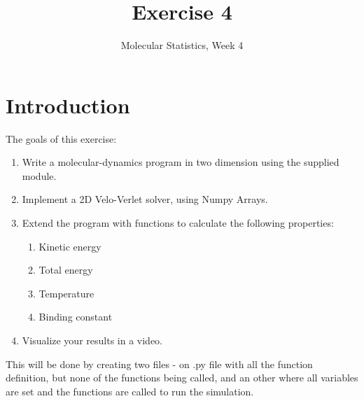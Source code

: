 \documentclass{article}
\title{Exercise 4}
\author{Molecular Statistics, Week 4}
\date{}
\begin{document}

\maketitle

\section{Introduction}









The goals of this exercise:
\begin{enumerate}
    \item Write a molecular-dynamics program in two dimension using the supplied module.

    \item Implement a 2D Velo-Verlet solver, using Numpy Arrays.

    \item Extend the program with functions to calculate the following properties:

    \begin{enumerate}
        \item Kinetic energy
        \item Total energy
        \item Temperature
        \item Binding constant
    \end{enumerate}

    \item Visualize your results in a video.

\end{enumerate}

This will be done by creating two files - on .py file with all the function definition, but none of the functions being called, and an other where all variables are set and the functions are called to run the simulation.
\end{document}
